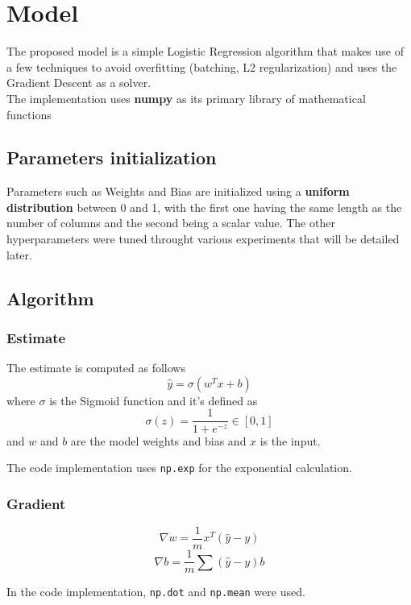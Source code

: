 \documentclass[
	letterpaper, %
	10pt, %
]{class}
\begin{document}

\section{Model}

The proposed model is a simple Logistic Regression \cite{logistic} algorithm that makes use of a few techniques to avoid overfitting (batching, L2 regularization) and uses the Gradient Descent as a solver.\\
The implementation uses \textbf{numpy} \cite{numpy} as its primary library of mathematical functions

\subsection{Parameters initialization}
Parameters such as Weights and Bias are initialized using a \textbf{uniform distribution} between 0 and 1, with the first one having the same length as the number of columns and the second being a scalar value.
The other hyperparameters were tuned throught various experiments that will be detailed later.

\subsection{Algorithm}

\subsubsection{Estimate}
The estimate is computed as follows
$$ \hat{y} = \sigma(w^Tx + b) $$
where $\sigma$ is the Sigmoid function \cite{sigmoid} and it's defined as
$$ \sigma(z) = \frac{1}{1 + e^{-z}} \in [0,1] $$
and $w$ and $b$ are the model weights and bias and $x$ is the input.

The code implementation uses \texttt{np.exp} for the exponential calculation.

\subsubsection{Gradient}

$$ \nabla w = \frac{1}{m}x^T(\hat{y} - y) $$
$$ \nabla b = \frac{1}{m}\sum(\hat{y} - y) b $$

In the code implementation, \texttt{np.dot} and \texttt{np.mean} were used.
\end{document}
